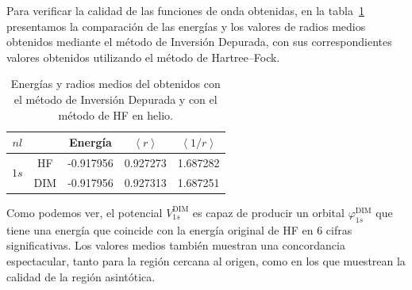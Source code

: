 Para verificar la calidad de las funciones de onda obtenidas, en la 
tabla~\ref{tab:resultadosHe} presentamos la comparación de las energías 
y los valores de radios medios obtenidos mediante el método de Inversión
Depurada, con sus correspondientes valores obtenidos utilizando el 
método de Hartree--Fock.

\begin{table}
\begin{center}
\begin{tabular}{|c|c|c|c|c|}
\hline
$nl$ & & Energía & $\left<r\right>$ & $\left<1/r\right>$ \\
\hline
\hline
\multirow{2}{*}{$1s$} 
     &  HF  & -0.917956 & 0.927273 & 1.687282 \\
     & DIM  & -0.917956 & 0.927313 & 1.687251 \\
\hline
\end{tabular}
\caption[Energías y radios medios obtenidos con DIM y HF para helio.]
{Energías y radios medios del obtenidos con el método de Inversión 
Depurada y con el método de HF en helio.}
\label{tab:resultadosHe}
\end{center}
\end{table}

Como podemos ver, el potencial $V_{1s}^{\mathrm{ DIM}}$ es capaz de 
producir un orbital $\varphi_{1s}^{\mathrm{ DIM}}$ que tiene una 
energía que coincide con la energía original de HF en 6 cifras 
significativas. 
Los valores medios también muestran una concordancia espectacular, 
tanto para la región cercana al origen, como en los que muestrean 
la calidad de la región asintótica.


